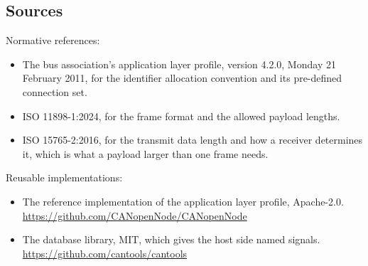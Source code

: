 \subsection*{Sources}

Normative references:
\begin{itemize}
\item The bus association's application layer profile, version 4.2.0, Monday 21
February 2011, for the identifier allocation convention and its pre-defined
connection set.
\item ISO 11898-1:2024, for the frame format and the allowed payload lengths.
\item ISO 15765-2:2016, for the transmit data length and how a receiver
determines it, which is what a payload larger than one frame needs.
\end{itemize}

Reusable implementations:
\begin{itemize}
\item The reference implementation of the application layer profile,
Apache-2.0.\newline
\url{https://github.com/CANopenNode/CANopenNode}
\item The database library, MIT, which gives the host side named signals.\newline
\url{https://github.com/cantools/cantools}
\end{itemize}
